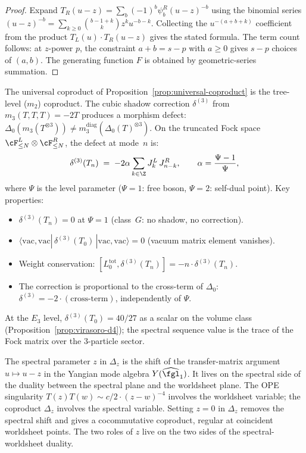 \begin{proof}
Expand $T_R(u-z) = \sum_b (-1)^b \psi_b^R (u-z)^{-b}$ using the binomial series $(u-z)^{-b} = \sum_{k \geq 0} \binom{b-1+k}{k} z^k u^{-b-k}$. Collecting the $u^{-(a+b+k)}$ coefficient from the product $T_L(u) \cdot T_R(u-z)$ gives the stated formula. The term count follows: at $z$-power $p$, the constraint $a + b = s - p$ with $a \geq 0$ gives $s - p$ choices of $(a, b)$. The generating function $F$ is obtained by geometric-series summation.
\end{proof}

\begin{remark}
\label{rem:delta3-fock-matrix}
The universal coproduct of Proposition~\ref{prop:universal-coproduct} is the tree-level ($m_2$) coproduct. The cubic shadow correction $\delta^{(3)}$ from $m_3(T,T,T) = -2T$ produces a morphism defect: $\Delta_0(m_3(T^{\otimes 3})) \neq m_3^{\mathrm{diag}}(\Delta_0(T)^{\otimes 3})$. On the truncated Fock space $\cF_{\leq N}^L \otimes \cF_{\leq N}^R$, the defect at mode~$n$ is:
\[
 \delta^{(3)}(T_n) \;=\; -2\alpha \sum_{k \in \Z} J_k^L \, J_{n-k}^R, \qquad \alpha = \frac{\Psi - 1}{\Psi},
\]
where $\Psi$ is the level parameter ($\Psi = 1$: free boson, $\Psi = 2$: self-dual point). Key properties:
\begin{itemize}
 \item $\delta^{(3)}(T_n) = 0$ at $\Psi = 1$ (class~$G$: no shadow, no correction).
 \item $\langle \mathrm{vac}, \mathrm{vac} | \, \delta^{(3)}(T_0) \, | \mathrm{vac}, \mathrm{vac} \rangle = 0$ (vacuum matrix element vanishes).
 \item Weight conservation: $[L_0^{\mathrm{tot}}, \delta^{(3)}(T_n)] = -n \cdot \delta^{(3)}(T_n)$.
 \item The correction is proportional to the cross-term of $\Delta_0$: $\delta^{(3)} = -2 \cdot (\text{cross-term})$, independently of $\Psi$.
\end{itemize}
At the $E_3$ level, $\delta^{(3)}(T_0) = 40/27$ as a scalar on the
volume class (Proposition~\ref{prop:virasoro-d4}); the spectral
sequence value is the trace of the Fock matrix over the $3$-particle
sector.
\end{remark}

\begin{remark}
\label{rem:z-spectral-vs-worldsheet}
The spectral parameter $z$ in $\Delta_z$ is the shift of the
transfer-matrix argument $u \mapsto u - z$ in the Yangian mode algebra
$Y(\widehat{\fgl}_1)$. It lives on the spectral side of the duality
between the spectral plane and the worldsheet plane. The OPE
singularity $T(z) T(w) \sim c/2 \cdot (z - w)^{-4}$ involves the
worldsheet variable; the coproduct $\Delta_z$ involves the spectral
variable. Setting $z = 0$ in $\Delta_z$ removes the spectral shift and
gives a cocommutative coproduct, regular at coincident worldsheet
points. The
two roles of $z$ live on the two sides of the spectral-worldsheet
duality.
\end{remark}

